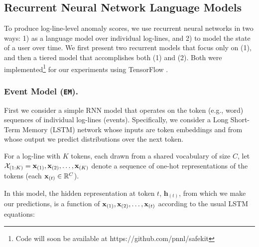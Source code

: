 \documentclass[letterpaper]{article} %
\begin{document}
\subsection{Recurrent Neural Network Language Models} \label{subsec:rnns}
To produce log-line-level anomaly scores, we use recurrent neural networks in two ways: 
1) as a language model over individual log-lines, and 
2) to model the state of a user over time.  
We first present two recurrent models that focus only on (1), 
and then a tiered model that accomplishes both (1) and (2). 
Both were implemented\footnote{Code will soon be available at https://github.com/pnnl/safekit} for our experiments using TensorFlow \cite{tensorflow2015-whitepaper}.


\subsubsection{Event Model (\texttt{EM}).}\label{subsec:simplemodel}
First we consider a simple RNN model that operates on the token (e.g., word) sequences of individual log-lines (events). 
Specifically, we consider a Long Short-Term Memory (LSTM) \cite{hochreiter1997long} 
network whose inputs are token embeddings and from whose output we predict distributions over the next token.

For a log-line with $K$ tokens, each drawn from a shared vocabulary of size $C$, let $\mathcal{X}_{(1:K)} = {\bf x}_{(1)}, {\bf x}_{(2)}, \dots, {\bf x}_{(K)}$ denote a sequence of one-hot representations of the tokens (each ${\bf x}_{(t)} \in \mathbb{R}^C$).  

In this model, the hidden representation at token $t$, $\textbf{h}_{(t)}$, from which we make our predictions, is a function of ${\bf x}_{(1)}, {\bf x}_{(2)}, \dots, {\bf x}_{(t)}$ according to the usual LSTM equations:
\end{document}
